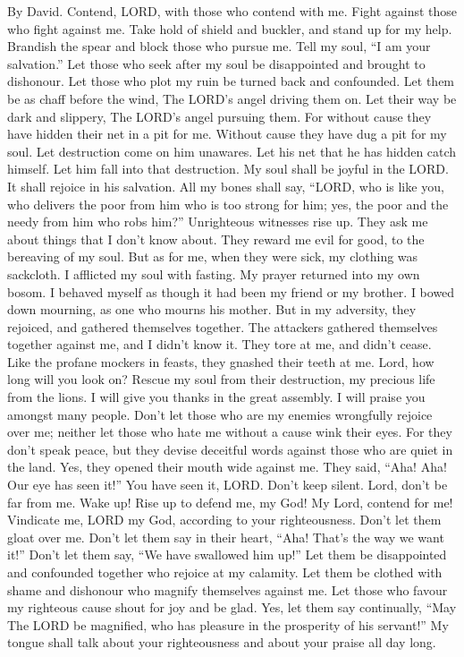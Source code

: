 By David.  Contend, LORD, with those who contend with me.
Fight against those who fight against me.  Take hold of
shield and buckler, and stand up for my help.  Brandish
the spear and block those who pursue me. Tell my soul, ``I am your
salvation.''  Let those who seek after my soul be
disappointed and brought to dishonour. Let those who plot my ruin be
turned back and confounded.  Let them be as chaff before
the wind, The LORD's angel driving them on.  Let their way
be dark and slippery, The LORD's angel pursuing them.  For
without cause they have hidden their net in a pit for me. Without cause
they have dug a pit for my soul.  Let destruction come on
him unawares. Let his net that he has hidden catch himself. Let him fall
into that destruction.  My soul shall be joyful in the
LORD. It shall rejoice in his salvation.  All my bones
shall say, ``LORD, who is like you, who delivers the poor from him who
is too strong for him; yes, the poor and the needy from him who robs
him?''  Unrighteous witnesses rise up. They ask me about
things that I don't know about.  They reward me evil for
good, to the bereaving of my soul.  But as for me, when
they were sick, my clothing was sackcloth. I afflicted my soul with
fasting. My prayer returned into my own bosom.  I behaved
myself as though it had been my friend or my brother. I bowed down
mourning, as one who mourns his mother.  But in my
adversity, they rejoiced, and gathered themselves together. The
attackers gathered themselves together against me, and I didn't know it.
They tore at me, and didn't cease.  Like the profane
mockers in feasts, they gnashed their teeth at me.  Lord,
how long will you look on? Rescue my soul from their destruction, my
precious life from the lions.  I will give you thanks in
the great assembly. I will praise you amongst many people.
 Don't let those who are my enemies wrongfully rejoice
over me; neither let those who hate me without a cause wink their eyes.
 For they don't speak peace, but they devise deceitful
words against those who are quiet in the land.  Yes, they
opened their mouth wide against me. They said, ``Aha! Aha! Our eye has
seen it!''  You have seen it, LORD. Don't keep silent.
Lord, don't be far from me.  Wake up! Rise up to defend
me, my God! My Lord, contend for me!  Vindicate me, LORD
my God, according to your righteousness. Don't let them gloat over me.
 Don't let them say in their heart, ``Aha! That's the way
we want it!'' Don't let them say, ``We have swallowed him up!''
 Let them be disappointed and confounded together who
rejoice at my calamity. Let them be clothed with shame and dishonour who
magnify themselves against me.  Let those who favour my
righteous cause shout for joy and be glad. Yes, let them say
continually, ``May The LORD be magnified, who has pleasure in the
prosperity of his servant!''  My tongue shall talk about
your righteousness and about your praise all day long.

